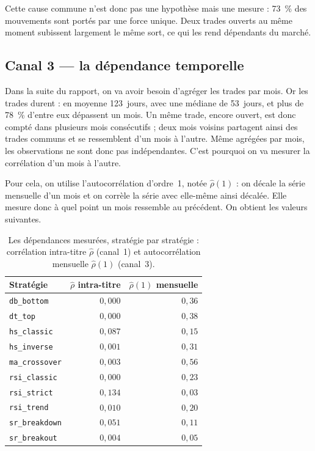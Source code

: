 Cette cause commune n'est donc pas une hypothèse mais une mesure : 73~\% des
mouvements sont portés par une force unique. Deux trades ouverts au même
moment subissent largement le même sort, ce qui les rend dépendants du marché.

\subsection{Canal 3 --- la dépendance temporelle}
\label{sec:dep-canal3}


Dans la suite du rapport, on va avoir besoin d'agréger les trades par mois.
Or les trades durent : en moyenne 123~jours, avec une médiane de 53~jours,
et plus de 78~\% d'entre eux dépassent un mois. Un même trade, encore ouvert,
est donc compté dans plusieurs mois consécutifs ; deux mois voisins partagent
ainsi des trades communs et se ressemblent d'un mois à l'autre.
Même agrégées par mois, les observations ne sont donc pas indépendantes.
C'est pourquoi on va mesurer la corrélation d'un mois à l'autre.

Pour cela, on utilise l'autocorrélation d'ordre~1, notée
$\hat\rho(1)$ : on décale la série mensuelle d'un mois et on corrèle la série
avec elle-même ainsi décalée. Elle mesure donc à quel point un mois ressemble
au précédent. On obtient les valeurs suivantes.
\begin{table}[H]
\centering
\caption{Les dépendances mesurées, stratégie par stratégie :
corrélation intra-titre $\hat\rho$ (canal~1) et autocorrélation
mensuelle $\hat\rho(1)$ (canal~3).}
\label{tab:dep-mesures}
\small
\begin{tabular}{@{}lrr@{}}
\toprule
Stratégie & $\hat\rho$ intra-titre & $\hat\rho(1)$ mensuelle \\
\midrule
\texttt{db\_bottom}    & $0{,}000$ & $0{,}36$ \\
\texttt{dt\_top}       & $0{,}000$ & $0{,}38$ \\
\texttt{hs\_classic}   & $0{,}087$ & $0{,}15$ \\
\texttt{hs\_inverse}   & $0{,}001$ & $0{,}31$ \\
\texttt{ma\_crossover} & $0{,}003$ & $0{,}56$ \\
\texttt{rsi\_classic}  & $0{,}000$ & $0{,}23$ \\
\texttt{rsi\_strict}   & $0{,}134$ & $0{,}03$ \\
\texttt{rsi\_trend}    & $0{,}010$ & $0{,}20$ \\
\texttt{sr\_breakdown} & $0{,}051$ & $0{,}11$ \\
\texttt{sr\_breakout}  & $0{,}004$ & $0{,}05$ \\
\bottomrule
\end{tabular}
\end{table}

